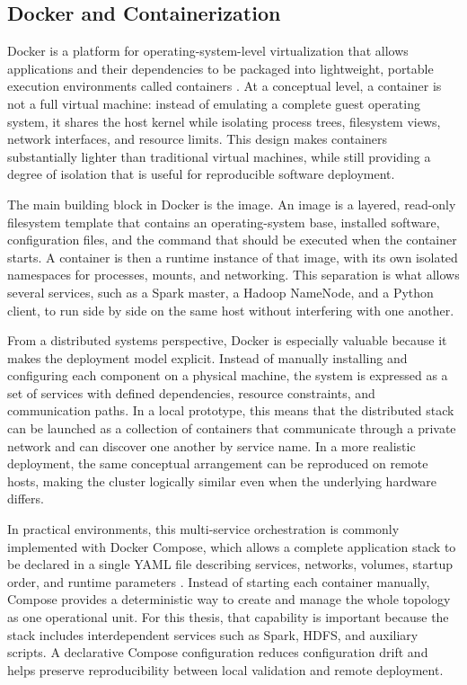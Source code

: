 \subsection{Docker and Containerization}
\label{subsec:cap2-docker-and-containerization}

Docker is a platform for operating-system-level virtualization that allows applications and their dependencies to be packaged into lightweight, portable execution environments called containers \parencite{merkel2014docker}. At a conceptual level, a container is not a full virtual machine: instead of emulating a complete guest operating system, it shares the host kernel while isolating process trees, filesystem views, network interfaces, and resource limits. This design makes containers substantially lighter than traditional virtual machines, while still providing a degree of isolation that is useful for reproducible software deployment.

The main building block in Docker is the image. An image is a layered, read-only filesystem template that contains an operating-system base, installed software, configuration files, and the command that should be executed when the container starts. A container is then a runtime instance of that image, with its own isolated namespaces for processes, mounts, and networking. This separation is what allows several services, such as a Spark master, a Hadoop NameNode, and a Python client, to run side by side on the same host without interfering with one another.

From a distributed systems perspective, Docker is especially valuable because it makes the deployment model explicit. Instead of manually installing and configuring each component on a physical machine, the system is expressed as a set of services with defined dependencies, resource constraints, and communication paths. In a local prototype, this means that the distributed stack can be launched as a collection of containers that communicate through a private network and can discover one another by service name. In a more realistic deployment, the same conceptual arrangement can be reproduced on remote hosts, making the cluster logically similar even when the underlying hardware differs.

In practical environments, this multi-service orchestration is commonly implemented with Docker Compose, which allows a complete application stack to be declared in a single YAML file describing services, networks, volumes, startup order, and runtime parameters \parencite{dockercompose2024}. Instead of starting each container manually, Compose provides a deterministic way to create and manage the whole topology as one operational unit. For this thesis, that capability is important because the stack includes interdependent services such as Spark, HDFS, and auxiliary scripts. A declarative Compose configuration reduces configuration drift and helps preserve reproducibility between local validation and remote deployment.

